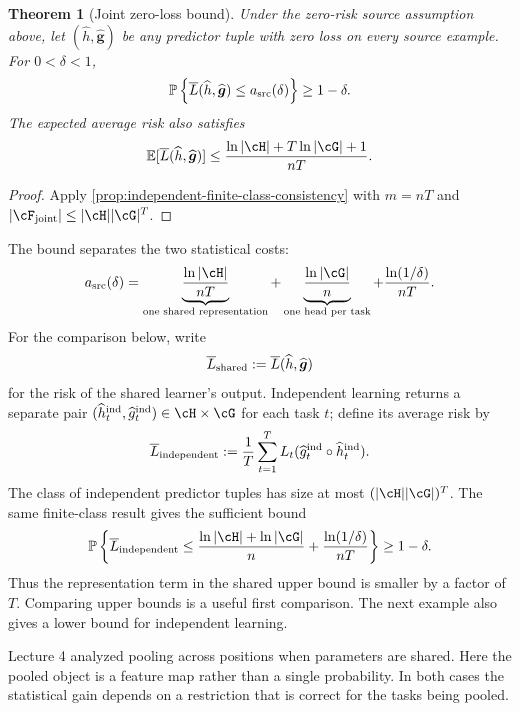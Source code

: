 \documentclass[11pt,twoside]{article}
\newcommand{\E}{\mathbb E}
\renewcommand{\P}{\mathbb P}
\newtheorem{theorem}{Theorem}[section]
\theoremstyle{definition}
\theoremstyle{remark}
\begin{document}
\begin{theorem}[Joint zero-loss bound]
\label{thm:consistent-multitask}
Under the zero-risk source assumption above, let
$(\widehat h,\widehat{\boldsymbol g})$ be any predictor tuple with zero loss
on every source example. For $0<\delta<1$,
\begin{equation}
 \P\left\{
 \overline L(\widehat h,\widehat{\boldsymbol g})
 \le a_{\rm src}(\delta)
 \right\}\ge1-\delta.
 \label{eq:consistent-multitask}
\end{equation}
The expected average risk also satisfies
\begin{equation}
 \E[\overline L(\widehat h,\widehat{\boldsymbol g})]
 \le \frac{\ln|\cH|+T\ln|\cG|+1}{nT}.
 \label{eq:expected-multitask}
\end{equation}
\end{theorem}

\begin{proof}
Apply \cref{prop:independent-finite-class-consistency} with
$m=nT$ and $|\cF_{\rm joint}|\le|\cH||\cG|^T$.
\end{proof}

The bound separates the two statistical costs:
\[
 a_{\rm src}(\delta)
 =\underbrace{\frac{\ln|\cH|}{nT}}_{\text{one shared representation}}
  +\underbrace{\frac{\ln|\cG|}{n}}_{\text{one head per task}}
  +\frac{\ln(1/\delta)}{nT}.
\]
For the comparison below, write
\[
 \overline L_{\rm shared}
 :=\overline L(\widehat h,\widehat{\boldsymbol g})
\]
for the risk of the shared learner's output. Independent learning returns a
separate pair $(\widehat h_t^{\rm ind},\widehat g_t^{\rm ind})\in
\cH\times\cG$ for each task $t$; define its average risk by
\[
 \overline L_{\rm independent}
 :=\frac1T\sum_{t=1}^T
 L_t(\widehat g_t^{\rm ind}\circ\widehat h_t^{\rm ind}).
\]
The class of independent predictor tuples has size at most
$(|\cH||\cG|)^T$. The same finite-class result gives the sufficient bound
\begin{equation}
 \P\left\{
 \overline L_{\rm independent}
 \le \frac{\ln|\cH|+\ln|\cG|}{n}
       +\frac{\ln(1/\delta)}{nT}
 \right\}\ge1-\delta.
 \label{eq:independent-upper}
\end{equation}
Thus the representation term in the shared upper bound is smaller by a
factor of $T$. Comparing upper bounds is a useful first comparison. The next
example also gives a lower bound for independent learning.

Lecture 4 analyzed pooling across positions when parameters are shared.
Here the pooled object is a feature map rather than a single probability.
In both cases the statistical gain depends on a restriction that is correct
for the tasks being pooled.
\end{document}
